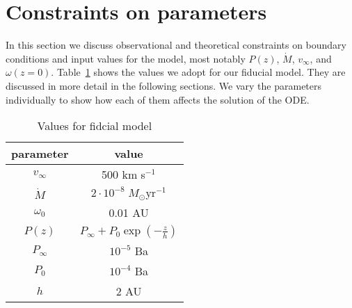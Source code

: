 \section{Constraints on parameters}
\label{sect:parameters}
In this section we discuss observational and theoretical constraints on boundary conditions and input values for the model, most notably $P(z)$, $\dot M$, $v_\infty$, and $\omega(z=0)$. Table~\ref{tab:fiducial} shows the values we adopt for our fiducial model. They are discussed in more detail in the following sections. We vary the parameters individually to show how each of them affects the solution of the ODE. 
\begin{table}
\label{tab:fiducial}
\caption{Values for fidcial model}
\begin{tabular}{cc}
\hline\hline
parameter & value\\
\hline
$v_\infty$ & 500 km s$^{-1}$\\
$\dot M$ & $2\cdot10^{-8}\;M_\odot\textrm{yr}^{-1}$\\
$\omega_0$ & 0.01 AU\\
$P(z)$ & $P_\infty+P_0\exp\left(-\frac{z}{h}\right)$\\
$P_\infty$ & $10^{-5}$ Ba\\
$P_0$ & $10^{-4}$ Ba\\
$h$ & 2 AU\\
\hline
\end{tabular}
\end{table}